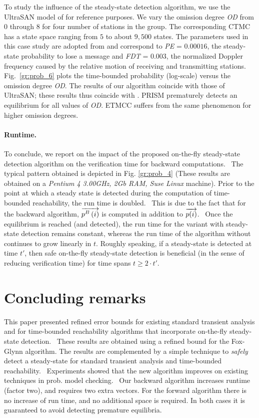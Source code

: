 \documentclass{entcs}
\newcommand{\Section}[1]{\section{#1}}
\begin{document}
		To study the influence of the steady-state detection algorithm, we use the UltraSAN model of \cite{MassinkKL_DSN04} for reference purposes.  We vary the omission degree {\it OD} from $0$ through $8$ for four number of stations in the group.  The corresponding CTMC has a state space ranging from $5$ to about $9,500$ states.   The parameters used in this case study are adopted from \cite{MassinkKL_DSN04} and correspond to {\it PE} = $0.00016$, the steady-state probability to lose a message and {\it FDT} = $0.003$, the normalized Doppler frequency caused by the relative motion of receiving and transmitting stations.   Fig.~\ref{gr:prob_6} plots the time-bounded probability (log-scale) versus the omission degree {\it OD}.  The results of our algorithm coincide with those of UltraSAN; these results thus coincide with \cite{MassinkKL_DSN04}.  PRISM prematurely detects an equilibrium for all values of {\it OD}.  ETMCC suffers from the same phenomenon for higher omission degrees.
	
	\paragraph{Runtime.}
		To conclude, we report on the impact of the proposed on-the-fly steady-state detection algorithm on the verification time for backward computations.  The typical pattern obtained is depicted in Fig. \ref{gr:prob_4} (These results are obtained on a \emph{Pentium 4 3.00GHz, 2Gb RAM, Suse Linux} machine). Prior to the point at which a steady state is detected during the computation of time-bounded reachability, the run time is doubled.  This is due to the fact that for the backward algorithm, $\overrightarrow{p^{B}\left( i \right)}$ is computed in addition to $\overrightarrow{p(i)}$.  Once the equilibrium is reached (and detected), the run time for the variant with steady-state detection remains constant, whereas the run time of the algorithm without continues to grow linearly in $t$.
		Roughly speaking, if a steady-state is detected at time $t'$, then safe on-the-fly steady-state detection is beneficial (in the sense of reducing verification time) for time spans $t \geq 2 \cdot t'$.

\Section{Concluding remarks \label{s:concl}}
	This paper presented refined error bounds for existing standard transient analysis and for time-bounded reachability algorithms that incorporate on-the-fly steady-state detection.  These results are obtained using a refined bound for the Fox-Glynn algorithm. The results are complemented by a simple technique to \emph{safely} detect a steady-state for standard transient analysis and time-bounded reachability.  Experiments showed that the new algorithm improves on existing techniques in prob. model checking.  Our backward algorithm increases runtime (factor two), and requires two extra vectors. For the forward algorithm there is no increase of run time, and no additional space is required. In both cases it is guaranteed to avoid detecting premature equilibria.
	
\end{document}
